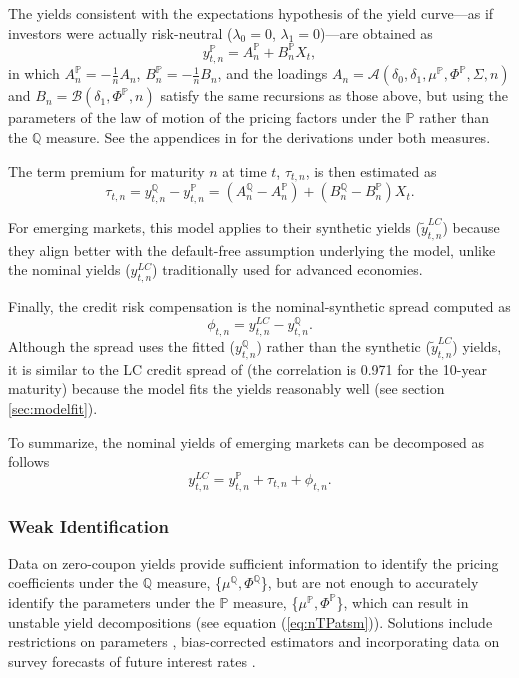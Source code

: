 \documentclass[a4paper, 12pt]{article}
\providecommand{\tnr}{n}
\providecommand{\idxt}{t}
\providecommand{\idxs}{\idxt,\tnr}
\providecommand{\yld}{y}
\providecommand{\yZero}{\yld_{\idxs}}
\providecommand{\yZeroQ}{\yZero^{\Qmeasure}}
\providecommand{\yZeroP}{\yZero^{\Pmeasure}}
\providecommand{\Xvars}{X_{\idxt}}
\providecommand{\affineA}{A_{\tnr}}
\providecommand{\affineB}{B_{\tnr}}
\providecommand{\affineAQ}{\affineA^{\Qmeasure}}
\providecommand{\affineBQ}{\affineB^{\Qmeasure}}
\providecommand{\affineAP}{\affineA^{\Pmeasure}}
\providecommand{\affineBP}{\affineB^{\Pmeasure}}
\providecommand{\yLCnom}{\yld_{\idxs} ^{LC}}
\providecommand{\yLCsynt}{\widetilde{\yld}_{\idxs} ^{LC}}
\providecommand{\Pmeasure}{\mathbb{P}}
\providecommand{\Qmeasure}{\mathbb{Q}}
\providecommand{\termprm}{\tau_{\idxs}}
\providecommand{\lambdazero}{\lambda_{0}}
\providecommand{\lambdaone}{\lambda_{1}}
\providecommand{\CIPdev}{\phi_{\idxs}}
\providecommand{\deltazero}{\delta_{0}}
\providecommand{\deltaone}{\delta_{1}}
\providecommand{\XmuP}{\mu^{\Pmeasure}}
\providecommand{\XmuQ}{\mu^{\Qmeasure}}
\providecommand{\XSigma}{\Sigma}
\providecommand{\XPhiP}{\Phi^{\Pmeasure}}
\providecommand{\XPhiQ}{\Phi^{\Qmeasure}}
\newcommand{\eqCIPdevQ}{\CIPdev = \yLCnom - \yZeroQ}
\newcommand{\eqLCnom}{\yLCnom = \yZeroP + \termprm + \CIPdev} %
\newcommand{\eqyZeroP}{\yZeroP = \affineAP + \affineBP \Xvars}
\newcommand{\eqTP}{\termprm = \yZeroQ - \yZeroP}
\begin{document}
The yields consistent with the expectations hypothesis of the yield curve---as if investors were actually risk-neutral (\(\lambdazero = 0\), \(\lambdaone = 0 \))---are obtained as
\begin{equation*}
\eqyZeroP ,
\end{equation*}
in which \(\affineAP = - \frac{1}{\tnr} \affineA\), \(\affineBP = - \frac{1}{\tnr} \affineB\), and the loadings \(\affineA = \mathcal{A}(\deltazero, \deltaone, \XmuP, \XPhiP, \XSigma, \tnr)\) and \(\affineB = \mathcal{B}(\deltaone, \XPhiP, \tnr)\) satisfy the same recursions as those above, but using the parameters of the law of motion of the pricing factors under the \(\Pmeasure\) rather than the \(\Qmeasure\) measure. See the appendices in \cite{Lloyd:2020} for the derivations under both measures. 

The term premium for maturity \(\tnr\) at time \(\idxt\), \(\termprm\), is then estimated as 
\begin{equation} \label{eq:nTPatsm}
\eqTP = (\affineAQ - \affineAP) + (\affineBQ  - \affineBP) \Xvars .
\end{equation}

For emerging markets, this model applies to their synthetic yields (\(\yLCsynt\)) because they align better with the default-free assumption underlying the model, unlike the nominal yields (\(\yLCnom\)) traditionally used for advanced economies. 

Finally, the credit risk compensation is the nominal-synthetic spread computed as 
\begin{equation} \label{eq:nCIPdevQ}
\eqCIPdevQ.
\end{equation}
Although the spread uses the fitted (\(\yZeroQ\)) rather than the synthetic (\(\yLCsynt\)) yields, it is similar to the LC credit spread of \cite{DuSchreger:2016JoF} (the correlation is 0.971 for the 10-year maturity) because the model fits the yields reasonably well (see section \ref{sec:modelfit}). 

To summarize, the nominal yields of emerging markets can be decomposed as follows 
\begin{equation*}
\eqLCnom .
\end{equation*}
\vspace{-1cm}

\subsubsection{Weak Identification} \label{sec:Identification}
Data on zero-coupon yields provide sufficient information to identify the pricing coefficients under the \(\Qmeasure\) measure, \{\(\XmuQ, \XPhiQ\)\}, but are not enough to accurately identify the parameters under the \(\Pmeasure\) measure, \{\(\XmuP, \XPhiP\)\}, which can result in unstable yield decompositions (see equation (\ref{eq:nTPatsm})). Solutions include restrictions on parameters \citep{Duffee:2010}, bias-corrected estimators \citep{BRW:2012} and incorporating data on survey forecasts of future interest rates \citep{KimWright:2005,KimOrphanides:2012}. 
\end{document}
